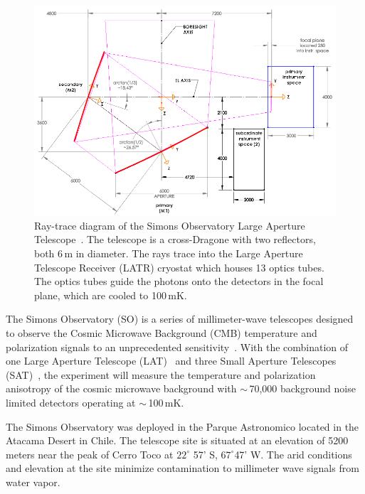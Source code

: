 \begin{figure}[t]
    \centering
    \includegraphics[width = .95\textwidth]{Figures/LAT_rt.pdf}
    \caption{Ray-trace diagram of the Simons Observatory Large Aperture Telescope~\cite{Parshley_2018}.  The telescope is a cross-Dragone with two reflectors, both 6\,m in diameter.  The rays trace into the Large Aperture Telescope Receiver (LATR) cryostat which houses 13 optics tubes.  The optics tubes guide the photons onto the detectors in the focal plane, which are cooled to 100\,mK.}
    \label{fig:so_inst}
\end{figure}

The Simons Observatory (SO) is a series of millimeter-wave telescopes designed to observe the Cosmic Microwave Background (CMB) temperature and polarization signals to an unprecedented sensitivity~\cite{gali18, so19}. With the combination of one Large Aperture Telescope (LAT)~\cite{xu/etal:2020c, zhu18, orlo18, coppi/etal:2018} and three Small Aperture Telescopes (SAT)~\cite{ali20}, the experiment will measure the temperature and polarization anisotropy of the cosmic microwave background with $\sim$\,70,000 background noise limited detectors operating at $\sim$\,100\,mK. 

The Simons Observatory was deployed in the Parque Astronomico located in the Atacama Desert in Chile. The telescope site is situated at an elevation of 5200 meters near the peak of Cerro Toco at $22 ^\circ$ 57' S, $67^\circ$47' W. The arid conditions and elevation at the site minimize contamination to millimeter wave signals from water vapor. 

